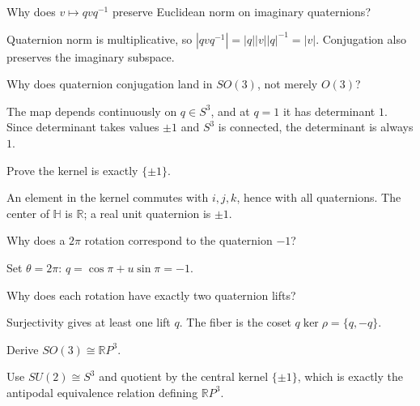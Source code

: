 \begin{problem}\label{prob:viii13-02}
Why does \(v\mapsto qvq^{-1}\) preserve Euclidean norm on imaginary quaternions?
\end{problem}
\begin{solution}
Quaternion norm is multiplicative, so \(|qvq^{-1}|=|q||v||q|^{-1}=|v|\). Conjugation also preserves the imaginary subspace.
\end{solution}

\begin{problem}[Orientation]\label{prob:viii13-03}
Why does quaternion conjugation land in \(SO(3)\), not merely \(O(3)\)?
\end{problem}
\begin{solution}
The map depends continuously on \(q\in S^3\), and at \(q=1\) it has determinant \(1\). Since determinant takes values \(\pm1\) and \(S^3\) is connected, the determinant is always \(1\).
\end{solution}

\begin{problem}\label{prob:viii13-04}
Prove the kernel is exactly \(\{\pm1\}\).
\end{problem}
\begin{solution}
An element in the kernel commutes with \(i,j,k\), hence with all quaternions. The center of \(\mathbb H\) is \(\mathbb R\); a real unit quaternion is \(\pm1\).
\end{solution}

\begin{problem}\label{prob:viii13-05}
Why does a \(2\pi\) rotation correspond to the quaternion \(-1\)?
\end{problem}
\begin{solution}
Set \(\theta=2\pi\): \(q=\cos\pi+u\sin\pi=-1\).
\end{solution}

\begin{problem}\label{prob:viii13-06}
Why does each rotation have exactly two quaternion lifts?
\end{problem}
\begin{solution}
Surjectivity gives at least one lift \(q\). The fiber is the coset \(q\ker\rho=\{q,-q\}\).
\end{solution}

\begin{problem}\label{prob:viii13-07}
Derive \(SO(3)\cong\mathbb RP^3\).
\end{problem}
\begin{solution}
Use \(SU(2)\cong S^3\) and quotient by the central kernel \(\{\pm1\}\), which is exactly the antipodal equivalence relation defining \(\mathbb RP^3\).
\end{solution}

